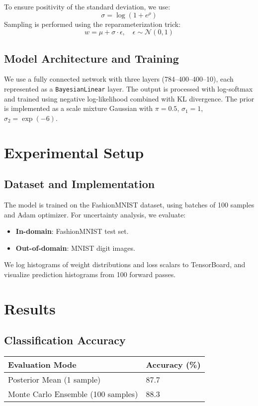 \documentclass{article}
\begin{document}
To ensure positivity of the standard deviation, we use:
\[
\sigma = \log(1 + e^{\rho})
\]
Sampling is performed using the reparameterization trick:
\[
w = \mu + \sigma \cdot \epsilon, \quad \epsilon \sim \mathcal{N}(0, 1)
\]

\subsection{Model Architecture and Training}

We use a fully connected network with three layers (784--400--400--10), each represented as a \texttt{BayesianLinear} layer. The output is processed with log-softmax and trained using negative log-likelihood combined with KL divergence. The prior is implemented as a scale mixture Gaussian with $\pi = 0.5$, $\sigma_1 = 1$, $\sigma_2 = \exp(-6)$.

\section{Experimental Setup}

\subsection{Dataset and Implementation}

The model is trained on the FashionMNIST dataset, using batches of 100 samples and Adam optimizer. For uncertainty analysis, we evaluate:
\begin{itemize}
    \item \textbf{In-domain}: FashionMNIST test set.
    \item \textbf{Out-of-domain}: MNIST digit images.
\end{itemize}

We log histograms of weight distributions and loss scalars to TensorBoard, and visualize prediction histograms from 100 forward passes.

\section{Results}

\subsection{Classification Accuracy}

\begin{center}
\begin{tabular}{@{}ll@{}}
\toprule
Evaluation Mode & Accuracy (\%) \\
\midrule
Posterior Mean (1 sample) & 87.7 \\
Monte Carlo Ensemble (100 samples) & 88.3 \\
\bottomrule
\end{tabular}
\end{center}
\end{document}
